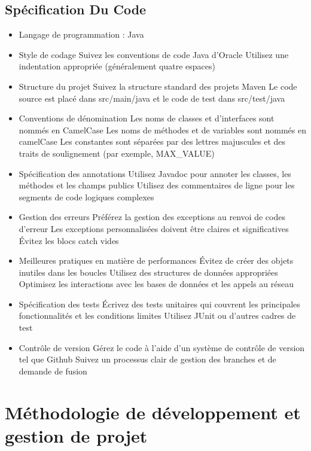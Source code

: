 \documentclass{article}
\begin{document}
\subsection{Spécification Du Code}
\begin{itemize}
    \item Langage de programmation : Java
    \item Style de codage 
    \subitem Suivez les conventions de code Java d'Oracle
    \subitem Utilisez une indentation appropriée (généralement quatre espaces)
    \item Structure du projet
    \subitem Suivez la structure standard des projets Maven
    \subitem Le code source est placé dans src/main/java et le code de test dans src/test/java
    \item Conventions de dénomination
    \subitem Les noms de classes et d'interfaces sont nommés en CamelCase
    \subitem Les noms de méthodes et de variables sont nommés en camelCase
    \subitem Les constantes sont séparées par des lettres majuscules et des traits de soulignement (par exemple, MAX\_VALUE)
    \item Spécification des annotations
    \subitem Utilisez Javadoc pour annoter les classes, les méthodes et les champs publics
    \subitem Utilisez des commentaires de ligne pour les segments de code logiques complexes
    \item Gestion des erreurs
    \subitem Préférez la gestion des exceptions au renvoi de codes d'erreur
    \subitem Les exceptions personnalisées doivent être claires et significatives
    \subitem Évitez les blocs catch vides
    \item Meilleures pratiques en matière de performances
    \subitem Évitez de créer des objets inutiles dans les boucles
    \subitem Utilisez des structures de données appropriées
    \subitem Optimisez les interactions avec les bases de données et les appels au réseau
    \item Spécification des tests
    \subitem Écrivez des tests unitaires qui couvrent les principales fonctionnalités et les conditions limites
    \subitem Utilisez JUnit ou d'autres cadres de test
    \item Contrôle de version
    \subitem Gérez le code à l'aide d'un système de contrôle de version tel que Github
    \subitem Suivez un processus clair de gestion des branches et de demande de fusion
\end{itemize}
\section{Méthodologie de développement et gestion de projet}
\end{document}
